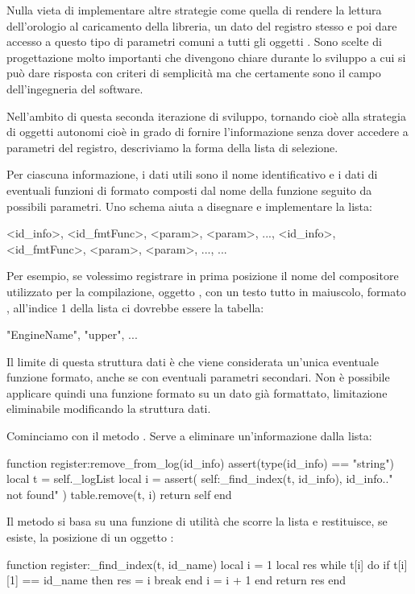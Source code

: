 Nulla vieta di implementare altre strategie come quella di rendere la lettura
dell'orologio al caricamento della libreria, un dato del registro stesso e poi
dare accesso a questo tipo di parametri comuni a tutti gli oggetti .
Sono scelte di progettazione molto importanti che divengono chiare durante lo
sviluppo a cui si può dare risposta con criteri di semplicità ma che certamente
sono il campo dell'ingegneria del software.

Nell'ambito di questa seconda iterazione di sviluppo, tornando cioè alla
strategia di oggetti  autonomi cioè in grado di fornire l'informazione
senza dover accedere a parametri del registro, descriviamo la forma
della lista di selezione.

Per ciascuna informazione, i dati utili sono il nome identificativo e i dati di
eventuali funzioni di formato composti dal nome della funzione seguito da
possibili parametri. Uno schema aiuta a disegnare e implementare la lista:
\begin{lines}
{
    { <id_info>, <id_fmtFunc>, <param>, <param>, ...},
    { <id_info>, <id_fmtFunc>, <param>, <param>, ...},
    ...
}
\end{lines}

Per esempio, se volessimo registrare in prima posizione il nome del compositore
utilizzato per la compilazione, oggetto , con un testo tutto in
maiuscolo, formato , all'indice 1 della lista  ci
dovrebbe essere la tabella:
\begin{lines}
{
    {"EngineName", "upper"},
    ...
}
\end{lines}

Il limite di questa struttura dati è che viene considerata un'unica eventuale
funzione formato, anche se con eventuali parametri secondari. Non è possibile
applicare quindi una funzione formato su un dato già formattato, limitazione
eliminabile modificando la struttura dati.

Cominciamo con il metodo . Serve a eliminare
un'informazione dalla lista:
\begin{lines}
function register:remove_from_log(id_info)
    assert(type(id_info) == "string")
    local t = self._logList
    local i = assert(
        self:_find_index(t, id_info), id_info.." not found"
    )
    table.remove(t, i)
    return self
end
\end{lines}

Il metodo si basa su una funzione di utilità  che scorre la
lista e restituisce, se esiste, la posizione di un oggetto :
\begin{lines}
function register:_find_index(t, id_name)
    local i = 1
    local res
    while t[i] do
        if t[i][1] == id_name then
            res = i
            break
        end
        i = i + 1
    end
    return res
end
\end{lines}

